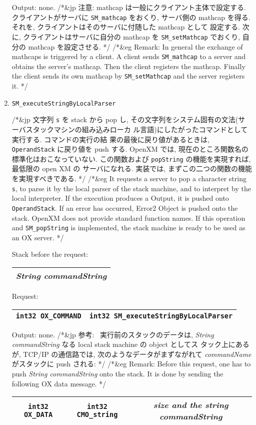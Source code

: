 \begin{enumerate}
Output:  none.
/*&jp
\noindent
注意: mathcap は一般にクライアント主体で設定する.
クライアントがサーバに {\tt SM\_mathcap} をおくり,
サーバ側の mathcap を得る.
それを, クライアントはそのサーバに付随した mathcap として
設定する.
次に, クライアントはサーバに自分の mathcap を
{\tt SM\_setMathcap} でおくり, 自分の mathcap を設定させる.
*/
/*&eg
\noindent
Remark: In general the exchange of mathcaps is triggered by a client.
A client sends {\tt SM\_mathcap} to a server and obtains the server's
mathcap. Then the client registers the mathcap. Finally the client
sends its own mathcap by {\tt SM\_setMathcap} and the server
registers it.
*/

\item
\begin{verbatim}
SM_executeStringByLocalParser
\end{verbatim}
/*&jp
文字列 {\tt s} を stack から pop し, 
その文字列をシステム固有の文法(サーバスタックマシンの組み込みローカ
ル言語)にしたがったコマンドとして実行する.  コマンドの実行の結
果の最後に戻り値があるときは, {\tt OperandStack} に戻り値を push する.
OpenXM では, 現在のところ関数名の標準化はおこなっていない.  
この関数および {\tt popString} の機能を実現すれば, 最低限の open XM の
サーバになれる.  実装では, まずこの二つの関数の機能を実現すべきである.
*/
/*&eg
It requests a server to pop a character string {\tt s}, to
parse it by the local parser of the stack machine,  and
to interpret by the local interpreter.
If the execution produces a Output, it is pushed onto 
{\tt OperandStack}.
If an error has occurred,  Error2 Object is pushed onto the stack.
OpenXM does not provide standard function names.
If this operation and {\tt SM\_popString} is implemented, the stack machine
is ready to be used as an OX server.
*/

Stack before the request: 
\\
\begin{tabular}{|c|}  \hline
{\it String commandString} \\
\hline 
\end{tabular} 

Request: 
\begin{tabular}{|c|c|}  \hline
{\tt int32 OX\_COMMAND}& {\tt int32 SM\_executeStringByLocalParser} \\
\hline 
\end{tabular}

Output:  none.
/*&jp
\noindent
参考: \  実行前のスタックのデータは,
{\it String commandString} なる local stack machine の object としてス
タック上にあるが, TCP/IP の通信路では, 次のようなデータがまずながれて
{\it commandName} がスタックに push される:
*/
/*&eg
\noindent
Remark: Before this request, one has to push {\it String commandString}
onto the stack. It is done by sending the following OX data message.
*/
\begin{tabular}{|c|c|c|}  \hline
{\tt int32 OX\_DATA} & {\tt int32 CMO\_string} & {\it size and the string commandString} \\
\hline 
\end{tabular}


\end{enumerate}
